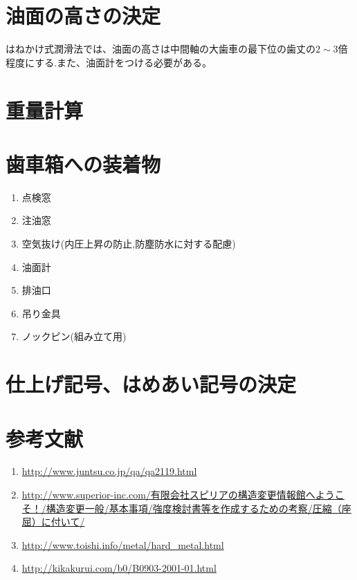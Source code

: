 \section{油面の高さの決定}
はねかけ式潤滑法では、油面の高さは中間軸の大歯車の最下位の歯丈の$2\sim3$倍程度にする.また、油面計をつける必要がある。
\section{重量計算}

\section{歯車箱への装着物}
\begin{enumerate}
\item 点検窓
\item 注油窓
\item 空気抜け(内圧上昇の防止,防塵防水に対する配慮)
\item 油面計
\item 排油口
\item 吊り金具
\item ノックピン(組み立て用)
\end{enumerate}
\section{仕上げ記号、はめあい記号の決定}

\section{参考文献}
\begin{enumerate}
\item \url{http://www.juntsu.co.jp/qa/qa2119.html}
\item \url{http://www.superior-inc.com/有限会社スピリアの構造変更情報館へようこそ！/構造変更一般/基本事項/強度検討書等を作成するための考察/圧縮（座屈）に付いて/}
\item \url{http://www.toishi.info/metal/hard_metal.html}
\item \url{http://kikakurui.com/b0/B0903-2001-01.html}
\end{enumerate}
